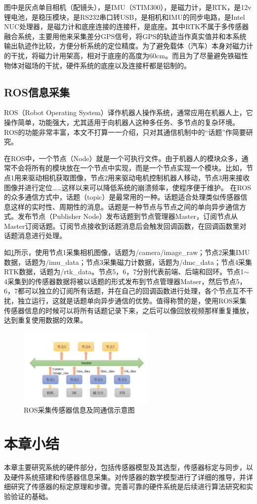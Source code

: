 图中是灰点单目相机（配镜头），是IMU（STIM300），是磁力计，是RTK，是12v锂电池，是稳压模块，是RS232串口转USB，是相机和IMU的同步电路，是Intel NUC处理器，是磁力计和底座连接的连接杆，是底座。其中RTK不属于多传感器融合系统，主要用他来采集差分GPS信号，将GPS的轨迹当作真实值并和本系统输出轨迹作比较，方便分析系统的定位精度。为了避免载体（汽车）本身对磁力计的干扰，将磁力计用架高，相对于底座的高度为60cm。而且为了尽量避免铁磁性物体对磁场的干扰，硬件系统的底座以及连接杆都是铝制的。
\subsection{ROS信息采集}
ROS（Robot Operating System）译作机器人操作系统，通常应用在机器人上，它操作简单，功能强大，尤其适用于向机器人这种多任务、多节点的复杂环境。ROS的功能非常丰富，本文不打算一一介绍，只对其通信机制中的“话题”作简要研究。

在ROS中，一个节点（Node）就是一个可执行文件。由于机器人的模块众多，通常不会将所有的模块放在一个节点中实现，而是一个节点实现一个模块。比如，节点1用来驱动相机获取图像，节点2用来驱动电机控制机器人移动，节点3用来接收图像并进行定位……这样以来可以降低系统的崩溃频率，使程序便于维护。
在ROS的众多通信方式中，话题（topic）是最常用的一种。话题适合处理类似传感器信息这样的实时性、周期性的消息。话题是一种节点与节点之间的单向异步通信方式。发布节点（Publisher Node）发布话题到节点管理器Master，订阅节点从Master订阅话题。订阅节点接收到话题消息后会触发回调函数，在回调函数里对话题消息进行处理。

如\ref{fig2_21}所示，使用节点1采集相机图像，话题为/camera/image\_raw；节点2采集IMU数据，话题为/imu\_data；节点3采集磁力计数据，话题为/dmc\_data；节点4采集RTK数据，话题为/rtk\_data。节点5，6，7分别代表前端、后端和回环。节点1$\sim$ 4采集到的传感器数据将被以话题的形式发布到节点管理器Matser，然后节点5，6，7都可以独立的订阅所有话题，并在自己的回调函数进行处理，各个节点互不干扰，独立运行，这就是话题单向异步通信的优势。值得称赞的是，使用ROS采集传感器信息的时候可以将所有话题记录下来，之后可以像回放视频那样重复播放，达到重复使用数据的效果。
\begin{figure}[h]\setlength{\belowcaptionskip}{-12pt}
	\centering
	\includegraphics[width=0.6\textwidth]{figures/chapter2/fig2_21}
	\caption{ROS采集传感器信息及同通信示意图}\label{fig2_21}
\end{figure}
\section{本章小结}
本章主要研究系统的硬件部分，包括传感器模型及其选型，传感器标定与同步，以及硬件系统搭建和传感器信息采集。对传感器的数学模型进行了详细的推导，并详细研究了传感器的标定原理和步骤。完善可靠的硬件系统是后续进行算法研究和实验验证的基础。